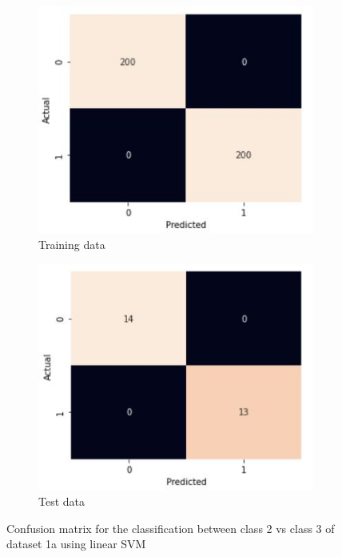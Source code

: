 \documentclass[11pt]{article}
\begin{document}
\begin{figure}[h!]
\centering
	\begin{subfigure}[b]{0.45\textwidth}
	\centering
	\includegraphics[scale=0.35]{dataset1a_linear_svm_23_cm_train.jpg}
	\caption{Training data}
	\label{fig:fig1.3.6.1}
	\end{subfigure}
	\begin{subfigure}[b]{0.45\textwidth}
	\centering
	\includegraphics[scale=0.35]{dataset1a_linear_svm_23_cm_test.jpg}
	\caption{Test data}
	\label{fig:fig1.3.6.2}
	\end{subfigure}
\caption{Confusion matrix for the classification between class 2 vs class 3 of dataset 1a using linear SVM}
\label{fig:fig1.3.6}
\end{figure}

\newpage
\end{document}
